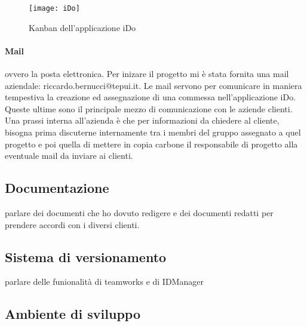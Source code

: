 \begin{figure}[!h] 
	\centering 
	\texttt{[image: iDo]} 
	\caption{Kanban dell'applicazione iDo}
	\label{ido}
\end{figure}

\paragraph{Mail} ovvero la posta elettronica. Per inizare il progetto mi è stata fornita una mail aziendale: riccardo.bernucci@tepui.it. Le mail servono per comunicare in maniera tempestiva la creazione ed assegnazione di una commessa nell'applicazione iDo. Queste ultime sono il principale mezzo di comunicazione con le aziende clienti. Una prassi interna all'azienda è che per informazioni da chiedere al cliente, bisogna prima discuterne internamente tra i membri del gruppo assegnato a quel progetto e poi quella di mettere in copia carbone il responsabile di progetto alla eventuale mail da inviare ai clienti.


\subsection{Documentazione}
\label{cap1:Documentazione}

parlare dei documenti che ho dovuto redigere e dei documenti redatti per prendere accordi con i diversi clienti.

\subsection{Sistema di versionamento}
\label{cap1:Sistema di versionamento}

parlare delle funionalità di teamworks e di IDManager

\subsection{Ambiente di sviluppo}
\label{cap1:Ambiente di sviluppo}


